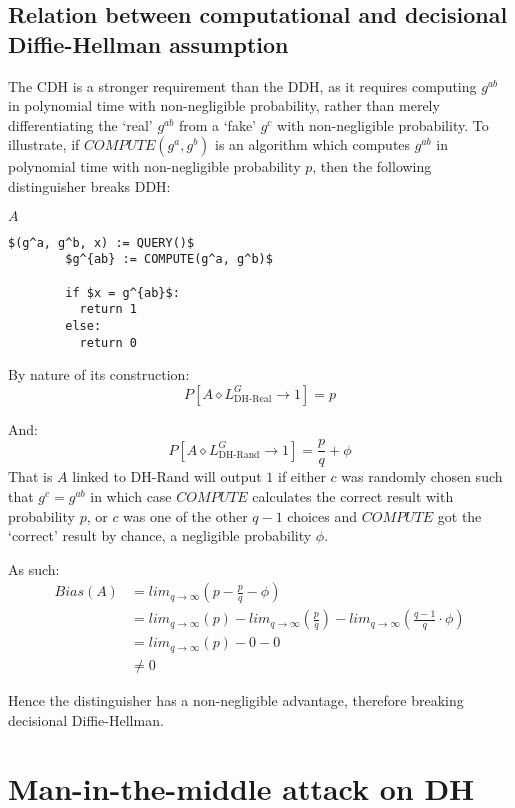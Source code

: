 \documentclass[a4paper]{scrreprt}
\begin{document}
\subsection{Relation between computational and decisional Diffie-Hellman assumption}

The CDH is a stronger requirement than the DDH, as it requires computing
$g^{ab}$ in polynomial time with non-negligible probability, rather than merely
differentiating the `real' $g^{ab}$ from a `fake' $g^c$ with non-negligible
probability. To illustrate, if $COMPUTE(g^a, g^b)$ is an algorithm which
computes $g^{ab}$ in polynomial time with non-negligible probability $p$, then
the following distinguisher breaks DDH:

\begin{library}{$A$}
	\begin{lstlisting}[mathescape=true,autogobble=true]
		$(g^a, g^b, x) := QUERY()$
		$g^{ab} := COMPUTE(g^a, g^b)$

		if $x = g^{ab}$:
		  return 1
		else:
		  return 0
	\end{lstlisting}
\end{library}

By nature of its construction:
\[
	P[A \diamond L^{G}_{\text{DH-Real}} \rightarrow 1] = p
\]

And:
\[
	P[A \diamond L^{G}_{\text{DH-Rand}} \rightarrow 1] = \frac{p}{q} + \phi
\]
That is $A$ linked to DH-Rand will output $1$ if either $c$ was randomly chosen
such that $g^c = g^{ab}$ in which case $COMPUTE$ calculates the correct result
with probability $p$, or $c$ was one of the other $q-1$ choices and $COMPUTE$
got the `correct' result by chance, a negligible probability $\phi$.

As such:
\begin{align*}
	Bias(A) & = lim_{q \rightarrow \infty}(p - \frac{p}{q} - \phi)\\
	        & = lim_{q \rightarrow \infty}(p) - lim_{q \rightarrow \infty}\left(\frac{p}{q}\right) - lim_{q \rightarrow \infty}\left(\frac{q-1}{q} \cdot \phi\right) \\
		& = lim_{q \rightarrow \infty}(p) - 0 - 0 \tag*{$\phi$ is negligible, $p \leq 1$} \\
		& \neq 0 \tag*{$p$ is not negligible}
\end{align*}

Hence the distinguisher has a non-negligible advantage, therefore breaking
decisional Diffie-Hellman.

\section{Man-in-the-middle attack on DH}
\end{document}
